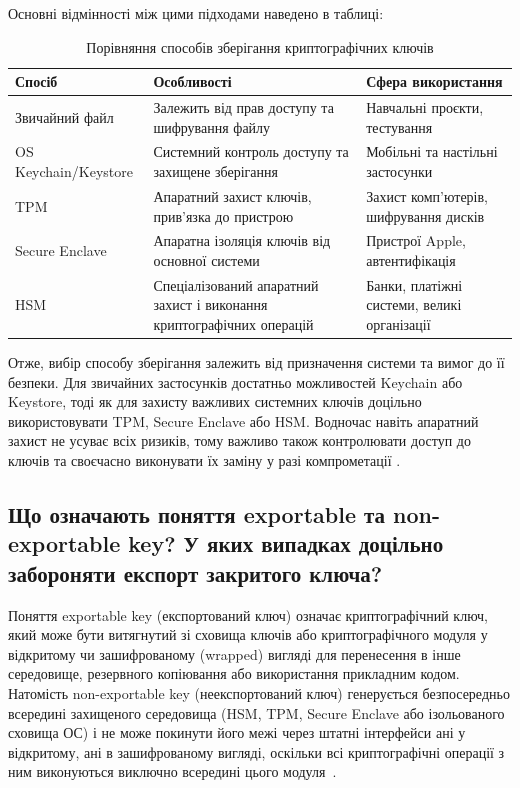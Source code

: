 Основні відмінності між цими підходами наведено в таблиці:

\begin{table}[h]
\centering
\caption{Порівняння способів зберігання криптографічних ключів}
\begin{tabular}{|p{3cm}|p{5cm}|p{4.5cm}|}
\hline
\textbf{Спосіб} & \textbf{Особливості} & \textbf{Сфера використання} \\
\hline
Звичайний файл & Залежить від прав доступу та шифрування файлу & Навчальні проєкти, тестування \\
\hline
OS Keychain/Keystore & Системний контроль доступу та захищене зберігання & Мобільні та настільні застосунки \\
\hline
TPM & Апаратний захист ключів, прив'язка до пристрою & Захист комп'ютерів, шифрування дисків \\
\hline
Secure Enclave & Апаратна ізоляція ключів від основної системи & Пристрої Apple, автентифікація \\
\hline
HSM & Спеціалізований апаратний захист і виконання криптографічних операцій & Банки, платіжні системи, великі організації \\
\hline
\end{tabular}
\end{table}

Отже, вибір способу зберігання залежить від призначення системи та вимог до її безпеки. Для звичайних застосунків достатньо 
можливостей Keychain або Keystore, тоді як для захисту важливих системних ключів доцільно використовувати TPM, Secure Enclave або HSM. 
Водночас навіть апаратний захист не усуває всіх ризиків, тому важливо також контролювати доступ до ключів та своєчасно виконувати 
їх заміну у разі компрометації \cite{owaspkey,owaspstorage}.

\subsection{Що означають поняття exportable та non-exportable key? У яких випадках доцільно забороняти експорт закритого ключа?}

Поняття exportable key (експортований ключ) означає криптографічний ключ, який може бути
витягнутий зі сховища ключів або криптографічного модуля у відкритому чи зашифрованому
(wrapped) вигляді для перенесення в інше середовище, резервного копіювання або використання
прикладним кодом. Натомість non-exportable key (неекспортований ключ) генерується безпосередньо
всередині захищеного середовища (HSM, TPM, Secure Enclave або ізольованого сховища ОС) і не може
покинути його межі через штатні інтерфейси ані у відкритому, ані в зашифрованому вигляді, оскільки всі
криптографічні операції з ним виконуються виключно всередині цього модуля~\cite{owaspkey, nistfips}.

